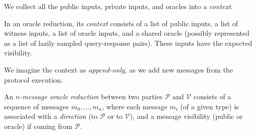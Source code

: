 We collect all the public inputs, private inputs, and oracles into a \emph{context}.

\begin{definition}[Context]\label{def:context}
    In an oracle reduction, its \emph{context} consists of a list of public inputs, a list of witness inputs, a list of oracle inputs, and a shared oracle (possibly represented as a list of lazily sampled query-response pairs). These inputs have the expected visibility.
\end{definition}

We imagine the context as \emph{append-only}, as we add new messages from the protocol execution.

\begin{definition}
    \label{def:oracle_reduction_type_signature}
    An \emph{$n$-message oracle reduction} between two parties $\mathcal{P}$ and $\mathcal{V}$
    consists of a sequence of messages $m_0, \dots, m_n$, where each message $m_i$ (of a given
    type) is associated with a \emph{direction} (to $\mathcal{P}$ or to $\mathcal{V}$), and a
    message visibility (public or oracle) if coming from $\mathcal{P}$.
    

\end{definition}



